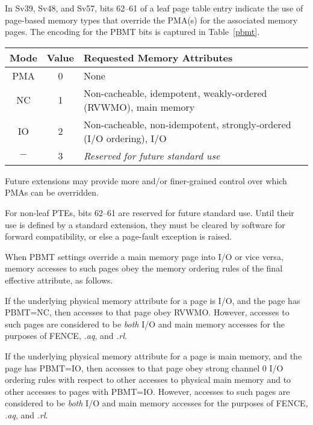 In Sv39, Sv48, and Sv57, bits 62--61 of a leaf page table entry indicate the use
of page-based memory types that override the PMA(s) for the associated memory
pages.  The encoding for the PBMT bits is captured in Table~\ref{pbmt}.

\begin{table*}[h!]
\begin{center}
\begin{tabular}{|c|c|l|}
\hline
Mode & Value  & Requested Memory Attributes \\
\hline
PMA  & 0      & None \\
NC   & 1      & Non-cacheable, idempotent, weakly-ordered (RVWMO), main memory \\
IO   & 2      & Non-cacheable, non-idempotent, strongly-ordered (I/O ordering), I/O \\
$-$  & 3      & {\em Reserved for future standard use} \\
\hline
\end{tabular}
\end{center}
\caption{Encodings for the PBMT field in Sv39, Sv48, and Sv57 PTEs.  Attributes
not mentioned are inherited from the PMA associated with the physical address.}
\label{pbmt}
\end{table*}

\begin{commentary}
Future extensions may provide more and/or finer-grained control over which PMAs
can be overridden.
\end{commentary}

For non-leaf PTEs, bits 62--61 are reserved for future standard use.  Until
their use is defined by a standard extension, they must be cleared by software
for forward compatibility, or else a page-fault exception is raised.

When PBMT settings override a main memory page into I/O or vice versa, memory
accesses to such pages obey the memory ordering rules of the final effective
attribute, as follows.

If the underlying physical memory attribute for a page is I/O, and the page has
PBMT=NC, then accesses to that page obey RVWMO.
However, accesses to such pages are
considered to be {\em both} I/O and main memory accesses for the purposes of FENCE,
{\em.aq}, and {\em.rl}.

If the underlying physical memory attribute for a page is main memory, and the
page has PBMT=IO, then accesses to that page obey strong channel 0 I/O ordering
rules with respect to other accesses to physical main memory and to other
accesses to pages with PBMT=IO.
However, accesses to such pages are
considered to be {\em both} I/O and main memory accesses for the purposes of FENCE,
{\em.aq}, and {\em.rl}.

